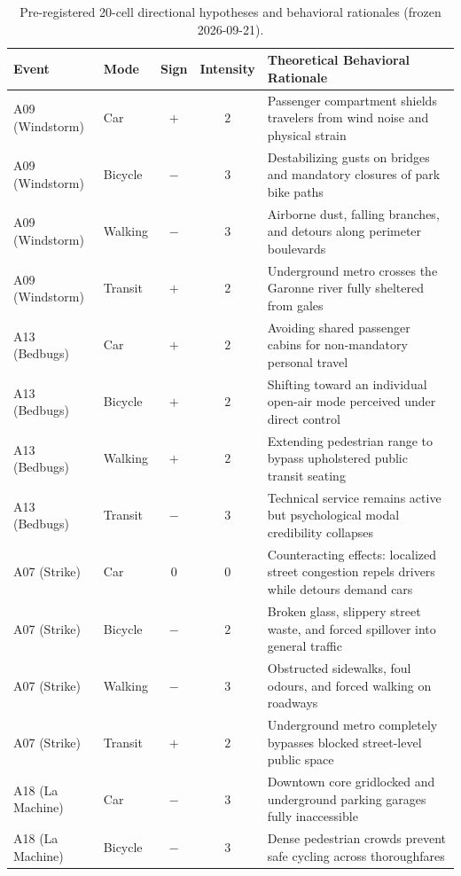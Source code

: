 \begin{table}[tp]
  \caption{Pre-registered 20-cell directional hypotheses and behavioral rationales (frozen 2026-09-21).}
  \label{tab-pre-registered-signs}
  \small
  \begin{tabularx}{\textwidth}{@{}llccL@{}}
    \toprule
    Event & Mode & Sign & Intensity & Theoretical Behavioral Rationale \\
    \midrule
    A09 (Windstorm) & Car & $+$ & $2$ & Passenger compartment shields travelers from wind noise and physical strain \\
    A09 (Windstorm) & Bicycle & $-$ & $3$ & Destabilizing gusts on bridges and mandatory closures of park bike paths \\
    A09 (Windstorm) & Walking & $-$ & $3$ & Airborne dust, falling branches, and detours along perimeter boulevards \\
    A09 (Windstorm) & Transit & $+$ & $2$ & Underground metro crosses the Garonne river fully sheltered from gales \\
    \midrule
    A13 (Bedbugs) & Car & $+$ & $2$ & Avoiding shared passenger cabins for non-mandatory personal travel \\
    A13 (Bedbugs) & Bicycle & $+$ & $2$ & Shifting toward an individual open-air mode perceived under direct control \\
    A13 (Bedbugs) & Walking & $+$ & $2$ & Extending pedestrian range to bypass upholstered public transit seating \\
    A13 (Bedbugs) & Transit & $-$ & $3$ & Technical service remains active but psychological modal credibility collapses \\
    \midrule
    A07 (Strike) & Car & $0$ & $0$ & Counteracting effects: localized street congestion repels drivers while detours demand cars \\
    A07 (Strike) & Bicycle & $-$ & $2$ & Broken glass, slippery street waste, and forced spillover into general traffic \\
    A07 (Strike) & Walking & $-$ & $3$ & Obstructed sidewalks, foul odours, and forced walking on roadways \\
    A07 (Strike) & Transit & $+$ & $2$ & Underground metro completely bypasses blocked street-level public space \\
    \midrule
    A18 (La Machine) & Car & $-$ & $3$ & Downtown core gridlocked and underground parking garages fully inaccessible \\
    A18 (La Machine) & Bicycle & $-$ & $3$ & Dense pedestrian crowds prevent safe cycling across thoroughfares \\

\end{tabularx}
\end{table}
